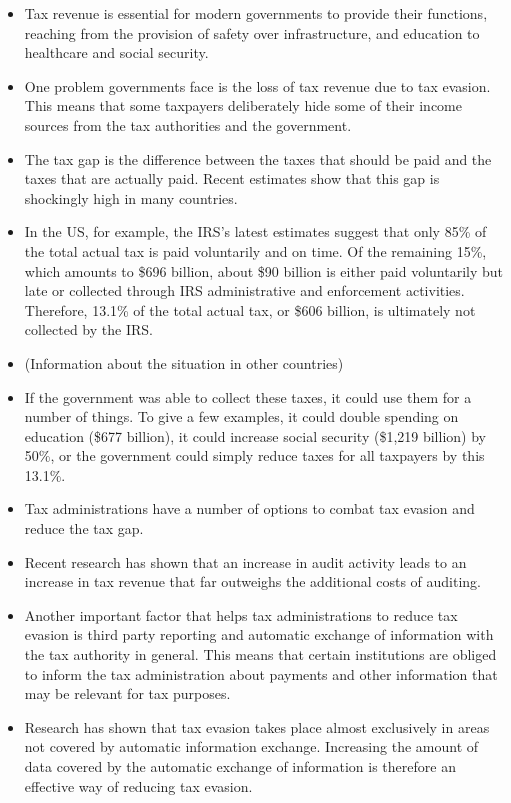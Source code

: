 \documentclass[12pt]{article}
\begin{document}
\begin{itemize}
\item Tax revenue is essential for modern governments to provide their functions, reaching from the provision of safety over infrastructure, and education to healthcare and social security.
\item One problem governments face is the loss of tax revenue due to tax evasion. This means that some taxpayers deliberately hide some of their income sources from the tax authorities and the government. 
\item The tax gap is the difference between the taxes that should be paid and the taxes that are actually paid. Recent estimates show that this gap is shockingly high in many countries.
\item In the US, for example, the IRS's latest estimates suggest that only 85\% of the total actual tax is paid voluntarily and on time. Of the remaining 15\%, which amounts to \$696 billion, about \$90 billion is either paid voluntarily but late or collected through IRS administrative and enforcement activities. Therefore, 13.1\% of the total actual tax, or \$606 billion, is ultimately not collected by the IRS.
\item (Information about the situation in other countries)
\item If the government was able to collect these taxes, it could use them for a number of things. To give a few examples, it could double spending on education (\$677 billion), it could increase social security (\$1,219 billion) by 50\%, or the government could simply reduce taxes for all taxpayers by this 13.1\%. 
\item Tax administrations have a number of options to combat tax evasion and reduce the tax gap.
\item Recent research has shown that an increase in audit activity leads to an increase in tax revenue that far outweighs the additional costs of auditing.
\item Another important factor that helps tax administrations to reduce tax evasion is third party reporting and automatic exchange of information with the tax authority in general. This means that certain institutions are obliged to inform the tax administration about payments and other information that may be relevant for tax purposes.
\item Research has shown that tax evasion takes place almost exclusively in areas not covered by automatic information exchange. Increasing the amount of data covered by the automatic exchange of information is therefore an effective way of reducing tax evasion.
\end{itemize}
\end{document}
